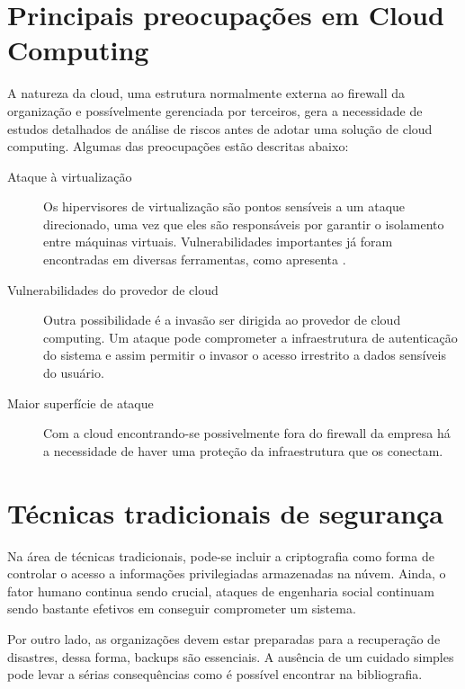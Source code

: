 \documentclass[brazil,12pt]{article}
\begin{document}
\section{Principais preocupações em Cloud Computing}
A natureza da cloud, uma estrutura normalmente externa ao firewall da
organização e possívelmente gerenciada por terceiros, gera a necessidade de
estudos detalhados de análise de riscos antes de adotar uma solução de cloud
computing. Algumas das preocupações estão descritas abaixo:

\begin{description}
  \item[Ataque à virtualização] Os hipervisores de virtualização são pontos
  sensíveis a um ataque direcionado, uma vez que eles são responsáveis por
  garantir o isolamento entre máquinas virtuais. Vulnerabilidades importantes já
  foram encontradas em diversas ferramentas, como apresenta 
  \cite{controlling-data-in-cloud}.
  \item[Vulnerabilidades do provedor de cloud] Outra possibilidade é a invasão
  ser dirigida ao provedor de cloud computing. Um ataque pode comprometer a
  infraestrutura de autenticação do sistema e assim permitir o invasor o acesso
  irrestrito a dados sensíveis do usuário.
  \item[Maior superfície de ataque] Com a cloud encontrando-se possivelmente
  fora do firewall da empresa há a necessidade de haver uma proteção da
  infraestrutura que os conectam.
\end{description}

\section{Técnicas tradicionais de segurança}
Na área de técnicas tradicionais, pode-se incluir a criptografia como forma de
controlar o acesso a informações privilegiadas armazenadas na núvem. Ainda, o
fator humano continua sendo crucial, ataques de engenharia social continuam
sendo bastante efetivos em conseguir comprometer um sistema.

Por outro lado, as organizações devem estar preparadas para a recuperação de
disastres, dessa forma, backups são essenciais. A ausência de um cuidado simples
pode levar a sérias consequências como é possível encontrar na bibliografia.
\end{document}
